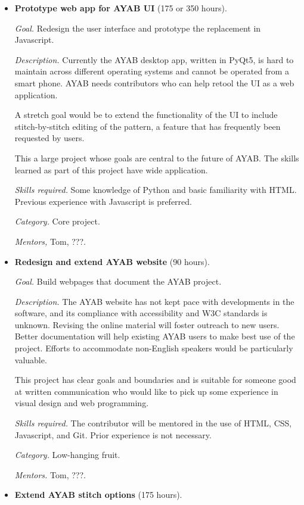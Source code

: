 \documentclass{article}
\begin{document}
\begin{itemize}
\item \textbf{Prototype web app for AYAB UI} (175 or 350 hours). 

\textit{Goal.} Redesign the user interface and prototype the replacement in Javascript.

\textit{Description.} Currently the AYAB desktop app, written in PyQt5, is hard to maintain across different operating systems and cannot be operated from a smart phone. AYAB needs contributors who can help retool the UI as a web application. 

A stretch goal would be to extend the functionality of the UI to include stitch-by-stitch editing of the pattern, a feature that has frequently been requested by users.

This a large project whose goals are central to the future of AYAB. The skills learned as part of this project have wide application.

\textit{Skills required.} Some knowledge of Python and basic familiarity with HTML. Previous experience with Javascript is preferred.

\textit{Category.} Core project. 

\textit{Mentors,} Tom, ???.


\item \textbf{Redesign and extend AYAB website} (90 hours). 

\textit{Goal.} Build webpages that document the AYAB project. 

\textit{Description.} The AYAB website has not kept pace with developments in the software, and its compliance with accessibility and W3C standards is unknown. Revising the online material will foster outreach to new users. Better documentation will help existing AYAB users to make best use of the project. Efforts to accommodate non-English speakers would be particularly valuable. 

This project has clear goals and boundaries and is suitable for someone good at written communication who would like to pick up some experience in visual design and web programming.

\textit{Skills required.} The contributor will be mentored in the use of HTML, CSS, Javascript, and Git. Prior experience is not necessary.

\textit{Category.} Low-hanging fruit. 

\textit{Mentors.} Tom, ???.


\item \textbf{Extend AYAB stitch options} (175 hours). 


\end{itemize}
\end{document}
